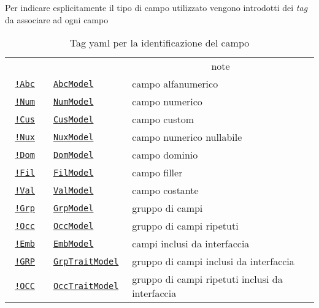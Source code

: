\documentclass[a4paper,10pt]{report}
\begin{document}
Per indicare esplicitamente il tipo di campo utilizzato vengono introdotti dei
\textsl{tag} da associare ad ogni campo

\begin{table}[!htb]
\centering
\begin{tabular}{|>{\tt}l|>{\tt}l|l|}
\hline
\multicolumn{3}{|c|}{Tag definizione campo}\\
\hline
\multicolumn{1}{|c|}{tag} & \multicolumn{1}{c|}{classe} 
	& \multicolumn{1}{c|}{note} \\
\hline
\hline
\hyperref[sub:yaml.abc]{!Abc} & \hyperref[lst:AbcModel]{AbcModel} & campo alfanumerico \\
\hline
\hyperref[sub:yaml.num]{!Num} & \hyperref[lst:NumModel]{NumModel} & campo numerico \\
\hline
\hyperref[sub:yaml.cus]{!Cus} & \hyperref[lst:CusModel]{CusModel} & campo custom \\
\hline
\hyperref[sub:yaml.nux]{!Nux} & \hyperref[lst:NuxModel]{NuxModel} & campo numerico nullabile \\
\hline
\hyperref[sub:yaml.dom]{!Dom} & \hyperref[lst:DomModel]{DomModel} & campo dominio \\
\hline
\hyperref[sub:yaml.fil]{!Fil} & \hyperref[lst:FilModel]{FilModel} & campo filler \\
\hline
\hyperref[sub:yaml.val]{!Val} & \hyperref[lst:ValModel]{ValModel} & campo costante \\
\hline
\hyperref[sub:yaml.grp]{!Grp} & \hyperref[lst:GrpModel]{GrpModel} & gruppo di campi \\
\hline
\hyperref[sub:yaml.occ]{!Occ} & \hyperref[lst:OccModel]{OccModel} & gruppo di campi ripetuti \\
\hline
\hyperref[sub:yaml.emb]{!Emb} & \hyperref[lst:EmbModel]{EmbModel} & campi inclusi da interfaccia \\
\hline
\hyperref[sub:yaml.igrp]{!GRP} & \hyperref[lst:GrpTraitModel]{GrpTraitModel} & gruppo di campi inclusi da interfaccia \\
\hline
\hyperref[sub:yaml.iocc]{!OCC} & \hyperref[lst:OccTraitModel]{OccTraitModel} & gruppo di campi ripetuti inclusi da interfaccia\\
\hline
\end{tabular}
\caption{Tag yaml per la identificazione del campo} 
\label{tab:tag.class}
\end{table}
\end{document}
